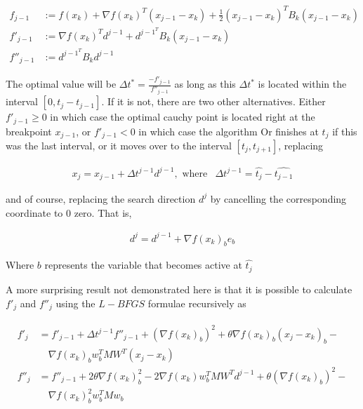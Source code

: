 \begin{align} \label{cauchydefinitions}
  f_{j-1} & := f(x_k) + \nabla f(x_k)^T ( x_{j-1} - x_k) + \frac{1}{2} ( x_{j-1} - x_k)^T B_k ( x_{j-1} - x_k) \\
  f'_{j-1} & := \nabla f(x_k)^T d^{j-1} + d^{{j-1}^T} B_k (x_{j-1} - x_k) \\
  f''_{j-1} & := d^{{j-1}^T} B_k d^{j-1}
\end{align}

The optimal value will be $\Delta t^* = \frac{-f'_{j-1}}{f''_{j-1}}$ as long as this $\Delta t^*$ is located within the interval $[0, t_j - t_{j-1}]$.  If it is not, there are two other alternatives.  Either $f'_{j-1} \geq 0$ in which case the optimal cauchy point is located right at the breakpoint $x_{j-1}$, or $f'_{j-1} < 0$ in which case the algorithm Or finishes at $t_j$ if this was the last interval, or it moves over to the interval $[t_j, t_{j+1}]$, replacing

\begin{align}
  x_j = x_{j-1} + \Delta t^{j-1} d^{j-1}, \text{ where} & 
  \Delta t^{j-1} = \hat{t_j} - \hat{t_{j-1}}
\end{align}

and of course, replacing the search direction $d^j$ by cancelling the corresponding coordinate to $0$ zero.  That is, 

\begin{equation}
  \begin{aligned}
    d^j = d^{j-1} + \nabla f(x_k)_b e_b
  \end{aligned}
\end{equation}

Where $b$ represents the variable that becomes active at $\hat{t_j}$

A more surprising result \citep{mainpaper} not demonstrated here is that it is possible to calculate $f'_j$ and $f''_j$ using the $L-BFGS$ formulae recursively as 

\begin{align} \label{cauchydeflbfgs}
  \begin{split}
  f'_j & = f'_{j-1} + \Delta t^{j-1} f''_{j-1} + (\nabla f(x_k)_b)^2 + \theta \nabla f(x_k)_b (x_j - x_k)_b - \\
  & \quad \nabla f(x_k)_b w_b^T MW^T (x_j - x_k) \\
  f''_j & = f''_{j-1} + 2 \theta \nabla f(x_k)_b^2 - 2 \nabla f(x_k) w_b^T M W^T d^{j-1} + \theta (\nabla f(x_k)_b)^2 - \\
  & \quad \nabla f(x_k)_b^2 w_b^T M w_b
  \end{split}
\end{align}

